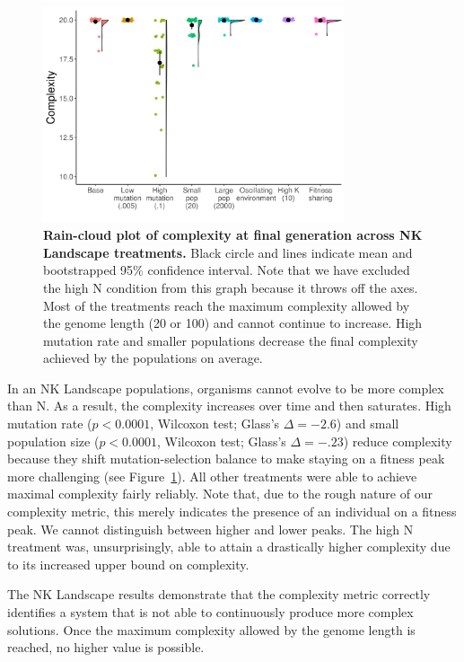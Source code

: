 \documentclass[letterpaper]{article}
\begin{document}
\begin{figure}
    \centering
\includegraphics[width=3.5in]{figs/dolson.complexityboxplots.png}
\caption{\textbf{Rain-cloud plot of complexity at final generation across NK Landscape treatments.} Black circle and lines indicate mean and bootstrapped 95\% confidence interval. Note that we have excluded the high N condition from this graph because it throws off the axes. Most of the treatments reach the maximum complexity allowed by the genome length (20 or 100) and cannot continue to increase. High mutation rate and smaller populations decrease the final complexity achieved by the populations on average.\label{complexity}}
\end{figure}

In an NK Landscape populations, organisms cannot evolve to be more complex than N. As a result, the complexity increases over time and then saturates. High mutation rate ($p<0.0001$, Wilcoxon test; Glass's $\Delta=-2.6$) and small population size ($p<0.0001$, Wilcoxon test; Glass's $\Delta=-.23$) reduce complexity because they shift mutation-selection balance to make staying on a fitness peak more challenging (see Figure~\ref{complexity}). All other treatments were able to achieve maximal complexity fairly reliably. Note that, due to the rough nature of our complexity metric, this merely indicates the presence of an individual on a fitness peak. We cannot distinguish between higher and lower peaks. The high N treatment was, unsurprisingly, able to attain a drastically higher complexity due to its increased upper bound on complexity.

The NK Landscape results demonstrate that the complexity metric correctly identifies a system that is not able to continuously produce more complex solutions. Once the maximum complexity allowed by the genome length is reached, no higher value is possible. 
\end{document}
